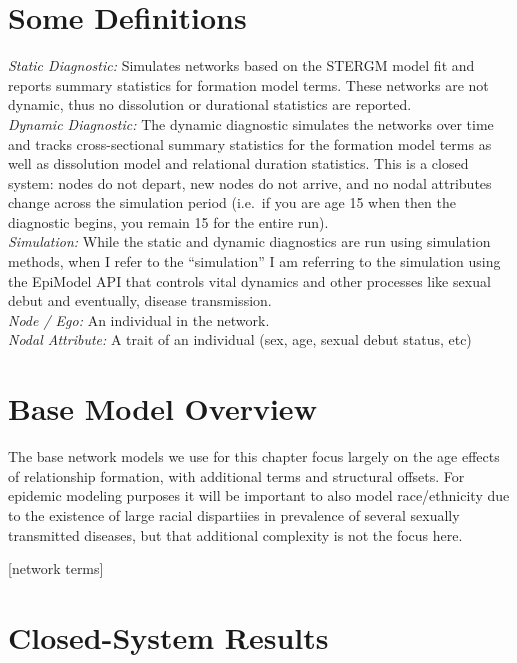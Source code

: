 \documentclass [11pt, proquest] {uwthesis}[2015/03/03]
\begin{document}
\section{Some Definitions}\label{some-definitions}

\emph{Static Diagnostic:} Simulates networks based on the STERGM model
fit and reports summary statistics for formation model terms. These
networks are not dynamic, thus no dissolution or durational statistics
are reported.\\
\emph{Dynamic Diagnostic:} The dynamic diagnostic simulates the networks
over time and tracks cross-sectional summary statistics for the
formation model terms as well as dissolution model and relational
duration statistics. This is a closed system: nodes do not depart, new
nodes do not arrive, and no nodal attributes change across the
simulation period (i.e.~if you are age 15 when then the diagnostic
begins, you remain 15 for the entire run).\\
\emph{Simulation:} While the static and dynamic diagnostics are run
using simulation methods, when I refer to the ``simulation'' I am
referring to the simulation using the EpiModel API that controls vital
dynamics and other processes like sexual debut and eventually, disease
transmission.\\
\emph{Node / Ego:} An individual in the network.\\
\emph{Nodal Attribute:} A trait of an individual (sex, age, sexual debut
status, etc)

\section{Base Model Overview}\label{base-model-overview}

The base network models we use for this chapter focus largely on the age
effects of relationship formation, with additional terms and structural
offsets. For epidemic modeling purposes it will be important to also
model race/ethnicity due to the existence of large racial dispartiies in
prevalence of several sexually transmitted diseases, but that additional
complexity is not the focus here.

{[}network terms{]}

\section{Closed-System Results}\label{closed-system-results}
\end{document}
